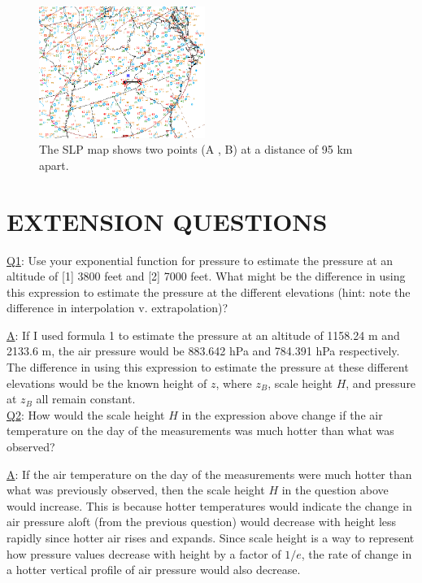 \documentclass[twocolumn]{article}
\begin{document}
\begin{figure}[!t] %
\begin{center}
\includegraphics[angle=0, width=0.48\textwidth]{map}
\end{center}
\caption{
The SLP map shows two points (A , B) at a distance of 95 km apart.
\label{map}
}
\end{figure}
\section{{\normalsize \hspace{-0.195in} {\textbf{
EXTENSION QUESTIONS
}}}} \vspace{-1.6mm}
\label{presure_extques.sec}

\underline{Q1}: Use your exponential function for pressure to estimate the pressure at an altitude of [1] 3800 feet and [2] 7000 feet. What might be the difference in using this expression to estimate the pressure at the different elevations (hint: note the difference in interpolation v. extrapolation)?

\underline{A}: If I used formula 1 to estimate the pressure at an altitude of 1158.24 m and 2133.6 m, the air pressure would be 883.642 hPa and 784.391 hPa respectively. The difference in using this expression to estimate the pressure at these different elevations would be the known height of $z$, where $z_B$, scale height $H$, and pressure at $z_B$ all remain constant. \\

\underline{Q2}: How would the scale height $H$ in the expression above change if the air temperature on the day of the measurements was much hotter than what was observed?

\underline{A}: If the air temperature on the day of the measurements were much hotter than what was previously observed, then the scale height $H$ in the question above would increase. This is because hotter temperatures would indicate the change in air pressure aloft (from the previous question) would decrease with height less rapidly since hotter air rises and expands. Since scale height is a way to represent how pressure values decrease with height by a factor of  $1/e$, the rate of change in a hotter vertical profile of air pressure would also decrease. \\
\end{document}
